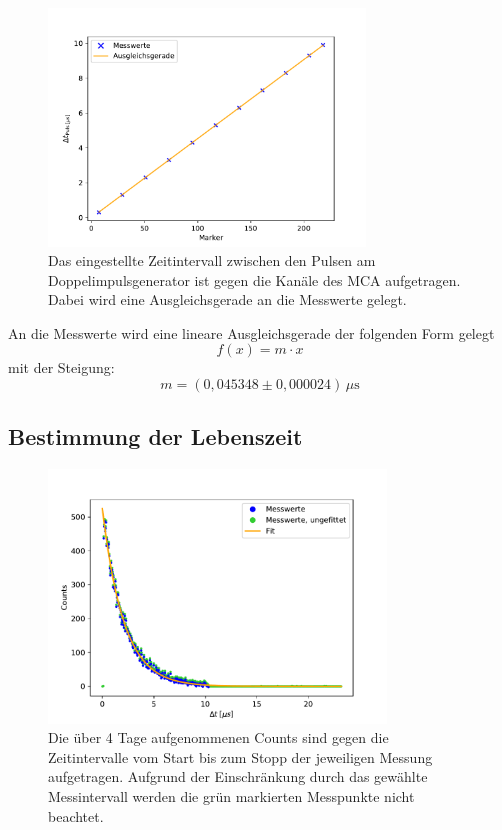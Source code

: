         \begin{figure}[h]
            \centering
            \includegraphics[width = 0.75\textwidth]{plots/Marker_Faktor.pdf}
            \caption{Das eingestellte Zeitintervall zwischen den Pulsen am Doppelimpulsgenerator ist gegen die Kanäle des MCA aufgetragen. Dabei wird eine Ausgleichsgerade an die Messwerte gelegt.}
            \label{fig:Marker_Faktor}
        \end{figure}

        \FloatBarrier

        An die Messwerte wird eine lineare Ausgleichsgerade der folgenden Form gelegt
        \begin{equation*}
            f(x) = m \cdot x
        \end{equation*}
        mit der Steigung:
        \begin{equation*}
            m = (0,045348 \pm 0,000024) \, \mu\text{s}
        \end{equation*}
    
    \newpage
    \subsection{Bestimmung der Lebenszeit}
        \begin{figure}[h]
            \centering
            \includegraphics[width = 0.8\textwidth]{plots/Lebenszeit.pdf}
            \caption{Die über 4 Tage aufgenommenen Counts sind gegen die Zeitintervalle vom Start bis zum Stopp der jeweiligen Messung aufgetragen. Aufgrund der Einschränkung durch das gewählte Messintervall werden die grün markierten Messpunkte nicht beachtet.}
            \label{fig:Lebenszeit}
        \end{figure}


